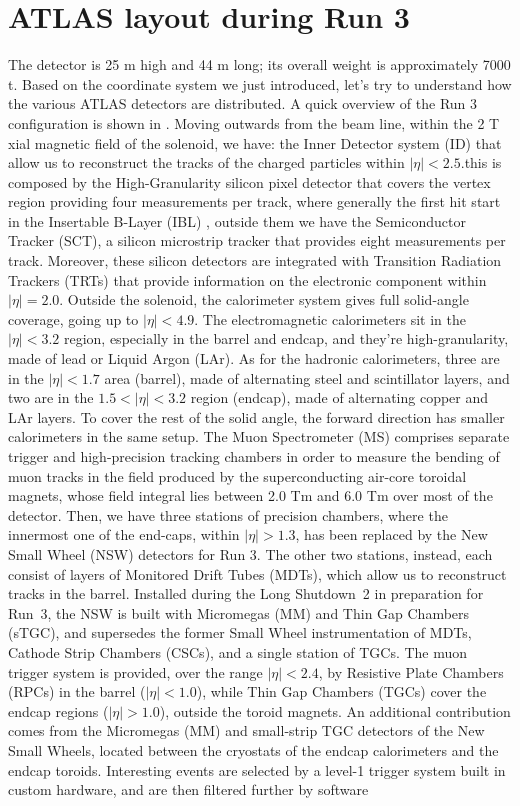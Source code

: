 \documentclass[11pt,a4paper,twoside,openright]{report}
\begin{document}
\section{ATLAS layout during Run 3}

The detector is 25 m high and 44 m long; its overall weight is approximately 7000 t. Based on the coordinate system we just introduced, let's try to understand how the various ATLAS detectors are distributed. A quick overview of the Run 3 configuration is shown in . Moving outwards from the beam line, within the 2 T xial magnetic field of the solenoid, we have: the Inner Detector system (ID) that allow us to reconstruct the tracks of the charged particles within \(|\eta|<2.5\).this is composed by the High-Granularity silicon pixel detector that covers the vertex region providing four measurements per track, where generally the first hit start in the Insertable B-Layer (IBL) \cite{ATLAScollab2, ATLASibl}, outside them we have the Semiconductor Tracker (SCT), a silicon microstrip tracker that provides eight measurements per track. Moreover, these silicon detectors are integrated with Transition Radiation Trackers (TRTs) that provide information on the electronic component within \(|\eta|=2.0\). Outside the solenoid, the calorimeter system gives full solid-angle coverage, going up to \(|\eta|<4.9\). The electromagnetic calorimeters sit in the \(|\eta|<3.2\) region, especially in the barrel and endcap, and they’re high-granularity, made of lead or Liquid Argon (LAr). As for the hadronic calorimeters, three are in the \(|\eta|<1.7\) area (barrel), made of alternating steel and scintillator layers, and two are in the \(1.5<|\eta|<3.2\) region (endcap), made of alternating copper and LAr layers. To cover the rest of the solid angle, the forward direction has smaller calorimeters in the same setup. The Muon Spectrometer (MS) comprises separate trigger and high-precision tracking chambers in order to measure the bending of muon tracks in the field produced by the superconducting air-core toroidal magnets, whose field integral lies between 2.0 Tm and 6.0 Tm over most of the detector. Then, we have three stations of precision chambers, where the innermost one of the end-caps, within \(|\eta|>1.3\), has been replaced by the New Small Wheel (NSW) detectors for Run 3. The other two stations, instead, each consist of layers of Monitored Drift Tubes (MDTs), which allow us to reconstruct tracks in the barrel. Installed during the Long Shutdown~2 in preparation for Run~3, the NSW is built with Micromegas (MM) and Thin Gap Chambers (sTGC), and supersedes the former Small Wheel instrumentation of MDTs, Cathode Strip Chambers (CSCs), and a single station of TGCs. The muon trigger system is provided, over the range $|\eta| < 2.4$, by Resistive Plate Chambers (RPCs) in the barrel ($|\eta| < 1.0$), while Thin Gap Chambers (TGCs) cover the endcap regions ($|\eta| > 1.0$), outside the toroid magnets. An additional contribution comes from the Micromegas (MM) and small-strip TGC detectors of the New Small Wheels, located between the cryostats of the endcap calorimeters and the endcap toroids. Interesting events are selected by a level-1 trigger system built in custom hardware, and are then filtered further by software 
\end{document}
